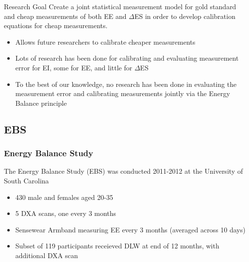 \documentclass[handout]{beamer}\usepackage[]{graphicx}\usepackage[]{color}
\begin{document}
\begin{frame}

\begin{block}{Research Goal}
Create a joint statistical measurement model for gold standard and cheap measurements of both EE and $\Delta$ES in order to develop calibration equations for cheap measurements.\\
\end{block}

\vspace{0.4cm}

\begin{itemize}
\item
Allows future researchers to calibrate cheaper measurements
\item
Lots of research has been done for calibrating and evaluating measurement error for EI, some for EE, and little for $\Delta$ES
\item
To the best of our knowledge, no research has been done in evaluating the measurement error and calibrating measurements jointly via the Energy Balance principle
\end{itemize}


\end{frame}


\subsection{EBS}

\begin{frame}
\frametitle{Energy Balance Study}
The Energy Balance Study (EBS) was conducted 2011-2012 at the University of South Carolina
\begin{itemize}
\item
430 male and females aged 20-35 \\
\item
5 DXA scans, one every 3 months
\item
Sensewear Armband measuring EE every 3 months (averaged across 10 days)
\item
Subset of 119 participants receieved DLW at end of 12 months, with additional DXA scan
\end{itemize}

\vspace{0.2cm}



\end{frame}
\end{document}
